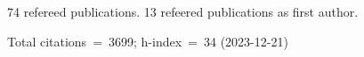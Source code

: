 74 refereed publications. 13 refeered publications as first author.

Total citations~=~3699; h-index~=~34 (2023-12-21)